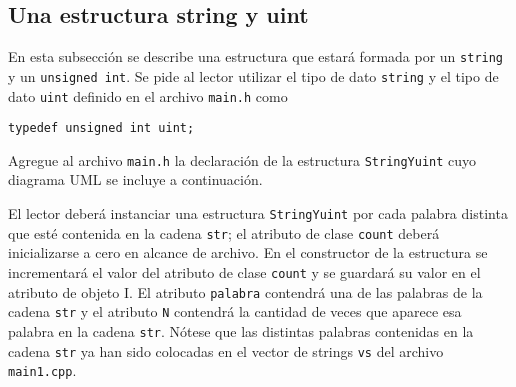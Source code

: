\documentclass[12pt]{article}
\begin{document}
\subsection*{Una estructura string y uint}
En esta subsecci\'{o}n se describe una estructura que estar\'{a} formada por un {\tt string} 
y un {\tt unsigned int}. Se pide al lector utilizar el tipo de dato {\tt string} y el tipo 
de dato {\tt uint} def\/inido en el archivo {\tt main.h} como
\begin{verbatim}
typedef unsigned int uint;
\end{verbatim}
Agregue al archivo {\tt main.h} la declaraci\'{o}n de la estructura {\tt StringYuint} cuyo 
diagrama UML se incluye a continuaci\'{o}n.
\begin{center}
\end{center}
El lector deber\'{a} instanciar una estructura {\tt StringYuint} por cada palabra distinta 
que est\'{e} contenida en la cadena {\tt str}; el atributo de clase {\tt count} deber\'{a} 
inicializarse a cero en alcance de archivo. En el constructor de la estructura se 
incrementar\'{a} el valor del atributo de clase {\tt count} y se guardar\'{a} su valor en 
el atributo de objeto I. El atributo {\tt palabra} contendr\'{a} una de las palabras de la 
cadena {\tt str} y el atributo {\tt N} contendr\'{a} la cantidad de veces que aparece esa 
palabra en la cadena {\tt str}. N\'{o}tese que las distintas palabras contenidas en la cadena 
{\tt str} ya han sido colocadas en el vector de strings {\tt vs} del archivo {\tt main1.cpp}.
\end{document}
